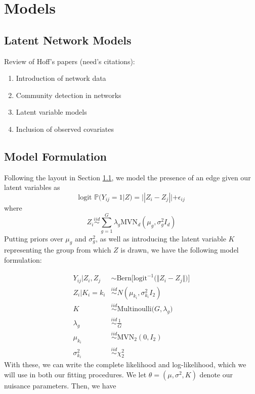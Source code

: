 \documentclass{article}
\begin{document}
\section{Models} \label{Models}

\subsection{Latent Network Models}\label{LNM}
Review of Hoff's papers (need's citations):
\begin{enumerate}
    \item Introduction of network data
    \item Community detection in networks
    \item Latent variable models 
    \item Inclusion of observed covariates
\end{enumerate}

\subsection{Model Formulation}\label{Model Formulation}

Following the layout in Section \ref{LNM}, we model the presence of an edge given our latent variables as
\[\text{logit } \mathbb{P}(Y_{ij} = 1|Z) = ||Z_i - Z_j|| + \epsilon_{ij}\]
where
\[Z_i \overset{iid}{\sim}\sum_{g=1}^G \lambda_g\text{MVN}_d(\mu_g,\sigma_g^2I_d)\]
Putting priors over $\mu_g$ and  $\sigma_g^2$, as well as introducing the latent variable $K$ representing the group from which $Z$ is drawn, we have the following model formulation:

\begin{align*}
Y_{ij} | Z_i, Z_j &\sim \text{Bern}\Big[\text{logit}^{-1}\big(\Vert Z_i - Z_j \Vert\big)\Big] \\
Z_i | K_i = k_i &\overset{iid}\sim N(\mu_{k_i}, \sigma_{k_i}^2 I_2) \\
K &\overset{iid}\sim \text{Multinoulli}\big(G, \lambda_g\big) \\
\lambda_g &\overset{iid}\sim \frac{1}{G} \\
\mu_{k_i} &\overset{iid}\sim \text{MVN}_2(0, I_2) \\
\sigma_{k_i}^2 &\overset{iid}\sim \chi^2_2
\end{align*}
With these, we can write the complete likelihood and log-likelihood, which we will use in both our fitting procedures. We let $\theta = (\mu, \sigma^2, K)$ denote our nuisance parameters. Then, we have
\end{document}
